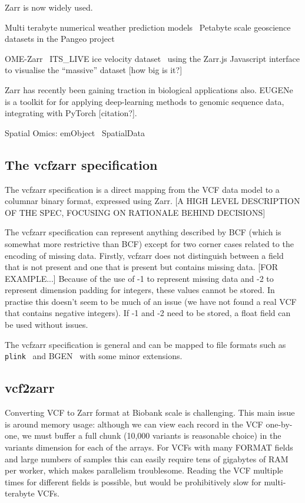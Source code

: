 \documentclass[a4paper,num-refs]{oup-contemporary}
\newcommand{\toolname}[1]{\texttt{#1}}
\begin{document}
Zarr is now widely used.

Multi terabyte numerical weather prediction models~\citep{gowan2022using}
Petabyte scale geoscience datasets in the Pangeo project

OME-Zarr~\cite{rzepka2023toward}
ITS\_LIVE ice velocity dataset~\citep{fahnestock2023mappin} using 
the Zarr.js Javascript interface to visualise the ``massive''
dataset [how big is it?]

Zarr has recently been gaining traction in biological applications
also. EUGENe~\citep{klie2023predictive} is a toolkit for 
for applying deep-learning methods to genomic sequence data,
integrating with PyTorch [citation?].

Spatial Omics:
emObject~\citep{baker2023emobject}
SpatialData~\citep{marconato2024spatialdata}


\subsection{The vcfzarr specification}
The vcfzarr specification is a direct mapping from the VCF data model 
to a columnar binary format, expressed using Zarr. [A HIGH LEVEL 
DESCRIPTION OF THE SPEC, FOCUSING ON RATIONALE BEHIND DECISIONS]

The vcfzarr specification can represent anything described by BCF
(which is somewhat more restrictive than BCF) except for two corner
cases related to the encoding of missing data. Firstly, vcfzarr does
not distinguish between a field that is not present and one that 
is present but contains missing data. [FOR EXAMPLE...]
Because of the use of -1 to represent missing data and -2 to 
represent dimension padding for integers, these values 
cannot be stored. In practise this doesn't seem to be much of 
an issue (we have not found a real VCF that contains negative 
integers). If -1 and -2 need to be stored, a float field
can be used without issues.

The vcfzarr specification is general and can be mapped to 
file formats such as \toolname{plink}~\citep{purcell2007plink,chang2015second}
and BGEN~\citep{band2018bgen} with some minor extensions.


\subsection{vcf2zarr}
Converting VCF to Zarr format at Biobank scale is challenging. This main issue is 
around memory usage: although we can view each record in the VCF one-by-one,
we must buffer a full chunk (10,000 variants is reasonable choice) 
in the variants dimension for each of the arrays. 
For VCFs with many FORMAT fields and large numbers of samples this can
easily require tens of gigabytes of RAM per worker, which makes 
parallelism troublesome. Reading the VCF multiple times for different fields
is possible, but would be prohibitively slow for multi-terabyte VCFs.
\end{document}
